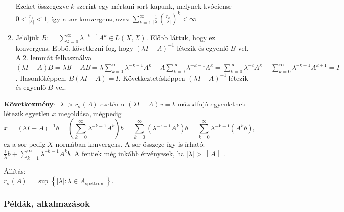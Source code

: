 \documentclass[12pt,a4paper]{scrartcl}
\newenvironment{bizonyitas}{}{}
\newenvironment{allitas}{}{}
\begin{document}
\begin{bizonyitas}
\begin{enumerate}
  Ezeket összegezve \(k\) szerint egy mértani sort kapunk, melynek
  kvóciense \(0 < \frac{r_{1}}{\left| \lambda \right|} < 1\), így a sor
  konvergens, azaz
  \({\sum\limits_{k = 1}^{\infty}{\frac{1}{\left| \lambda \right|}\left( \frac{r_{k}}{\left| \lambda \right|} \right)^{k}}} < \infty\).
\item
  Jelöljük
  \(B: = {\sum\limits_{k = 0}^{\infty}{\lambda^{- k - 1}A^{k}}} \in L\left( {X,X} \right)\).
  Előbb láttuk, hogy ez konvergens. Ebből következni fog, hogy
  \(\left( {\lambda I - A} \right)^{- 1}\) létezik és egyenlő \(B\)-vel.
  A 2. lemmát felhasználva:
  \(\left( {\lambda I - A} \right)B = \lambda B - AB = \lambda{\sum\limits_{k = 0}^{\infty}{\lambda^{- k - 1}A^{k}}} - A{\sum\limits_{k = 0}^{\infty}{\lambda^{- k - 1}A^{k}}} = {\sum\limits_{k = 0}^{\infty}{\lambda^{- k}A^{k}}} - {\sum\limits_{k = 0}^{\infty}{\lambda^{- k - 1}A^{k + 1}}} = I\).
  Hasonlóképpen, \(B\left( {\lambda I - A} \right) = I\).
  Következtetésképpen \(\left( {\lambda I - A} \right)^{- 1}\) létezik
  és egyenlő \(B\)-vel.
\end{enumerate}

\end{bizonyitas}

\textbf{Következmény}:
\(\left| \lambda \right| > r_{\sigma}\left( A \right)\) esetén a
\(\left( {\lambda I - A} \right)x = b\) másodfajú egyenletnek létezik
egyetlen \(x\) megoldása, mégpedig
\[x = \left( {\lambda I - A} \right)^{- 1}b = \left( {{\sum\limits_{k = 0}^{\infty}\lambda^{- k - 1}}A^{k}} \right)b = {\sum\limits_{k = 0}^{\infty}{\left( {\lambda^{- k - 1}A^{k}} \right)b}} = {\sum\limits_{k = 0}^{\infty}{\lambda^{- k - 1}\left( {A^{k}b} \right)}},\]
ez a sor pedig \(X\) normában konvergens. A sor összege így is írható:
\(\frac{1}{\lambda}b + {\sum\limits_{k = 1}^{\infty}{\lambda^{- k - 1}A^{k}b}}\).
A fentiek még inkább érvényesek, ha
\(\left| \lambda \right| > \left\| A \right\|\).

\begin{allitas}

Állítás:\\
\(r_{\sigma}\left( A \right) = \sup\left\{ {\left| \lambda \right|:\lambda \in A_{\text{spektrum}}} \right\}\).

\end{allitas}

\hypertarget{peldak-alkalmazasok}{%
\subsubsection{Példák, alkalmazások}\label{peldak-alkalmazasok}}
\end{document}

